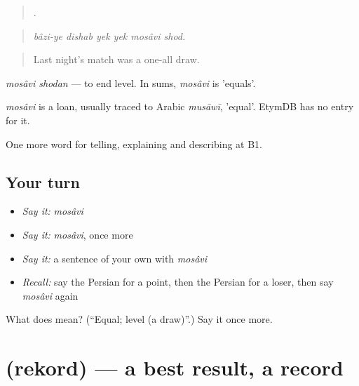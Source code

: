 \begin{quote}
     .
\end{quote}

\begin{quote}
\emph{bâzi-ye dishab yek yek mosâvi shod.}
\end{quote}

\begin{quote}
Last night's match was a one-all draw.
\end{quote}

\emph{mosâvi shodan} — to end level. In sums, \emph{mosâvi} is 'equals'.

\begin{cousinweb}
\emph{mosâvi} is a loan, usually traced to Arabic \emph{musāwī}, 'equal'. EtymDB has no entry for it.
\end{cousinweb}

\begin{grammarlens}[title={What you've built}]
One more word for telling, explaining and describing at B1.
\end{grammarlens}

\subsection*{Your turn}
\begin{itemize}
\raggedright
  \item \emph{Say it:} \emph{mosâvi}
  \item \emph{Say it:} \emph{mosâvi}, once more
  \item \emph{Say it:} a sentence of your own with \emph{mosâvi}
  \item \emph{Recall:} say the Persian for a point, then the Persian for a loser, then say \emph{mosâvi} again
\end{itemize}

\begin{tcolorbox}[breakable,colback=teal!4,colframe=teal!35!black,title={Before you move on}]
What does  mean? (\textquotedblleft{}Equal; level (a draw)\textquotedblright{}.) Say it once more.
\end{tcolorbox}
\section[\texorpdfstring{\fa{رکورد} (rekord)}{رکورد (rekord)}]{ (rekord) — a best result, a record}

\label{lesson:FA-C513-rekord}



